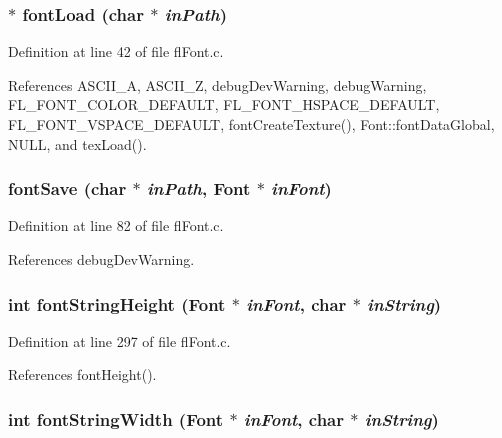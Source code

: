 \subsubsection{$\ast$ font\-Load (char $\ast$ {\em in\-Path})}\label{flFont_8h_21e0e8e442c8946619ed709ab8758dd5}




Definition at line 42 of file fl\-Font.c.

References ASCII\_\-A, ASCII\_\-Z, debug\-Dev\-Warning, debug\-Warning, FL\_\-FONT\_\-COLOR\_\-DEFAULT, FL\_\-FONT\_\-HSPACE\_\-DEFAULT, FL\_\-FONT\_\-VSPACE\_\-DEFAULT, font\-Create\-Texture(), Font::font\-Data\-Global, NULL, and tex\-Load().
\subsubsection{ font\-Save (char $\ast$ {\em in\-Path}, {\bf Font} $\ast$ {\em in\-Font})}\label{flFont_8h_9ff5be1b2dc43f06e50f98f7215de099}




Definition at line 82 of file fl\-Font.c.

References debug\-Dev\-Warning.
\subsubsection{\setlength{\rightskip}{0pt plus 5cm}int font\-String\-Height ({\bf Font} $\ast$ {\em in\-Font}, char $\ast$ {\em in\-String})}\label{flFont_8h_9b818f638545e3ddd7720598f9633d13}




Definition at line 297 of file fl\-Font.c.

References font\-Height().
\subsubsection{\setlength{\rightskip}{0pt plus 5cm}int font\-String\-Width ({\bf Font} $\ast$ {\em in\-Font}, char $\ast$ {\em in\-String})}\label{flFont_8h_d75ea5a21fc0145cf0509698bbd57ed4}




